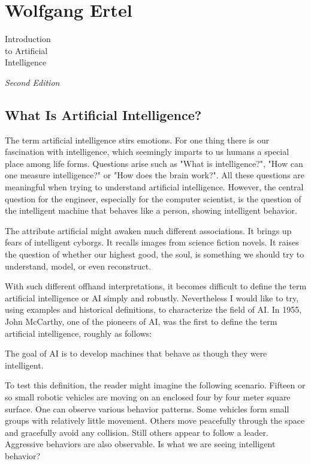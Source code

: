 \documentclass[10pt]{book}
\begin{document}
\section{Wolfgang Ertel}

\begin{center}
Introduction\\
to Artificial\\
Intelligence
\end{center}

\textit{Second Edition}

\tableofcontents

\tableofcontents

\subsection{What Is Artificial Intelligence?}
The term artificial intelligence stirs emotions. For one thing there is our fascination with intelligence, which seemingly imparts to us humans a special place among life forms. Questions arise such as "What is intelligence?", "How can one measure intelligence?" or "How does the brain work?". All these questions are meaningful when trying to understand artificial intelligence. However, the central question for the engineer, especially for the computer scientist, is the question of the intelligent machine that behaves like a person, showing intelligent behavior.

The attribute artificial might awaken much different associations. It brings up fears of intelligent cyborgs. It recalls images from science fiction novels. It raises the question of whether our highest good, the soul, is something we should try to understand, model, or even reconstruct.

With such different offhand interpretations, it becomes difficult to define the term artificial intelligence or AI simply and robustly. Nevertheless I would like to try, using examples and historical definitions, to characterize the field of AI. In 1955, John McCarthy, one of the pioneers of AI, was the first to define the term artificial intelligence, roughly as follows:

The goal of AI is to develop machines that behave as though they were intelligent.

To test this definition, the reader might imagine the following scenario. Fifteen or so small robotic vehicles are moving on an enclosed four by four meter square surface. One can observe various behavior patterns. Some vehicles form small groups with relatively little movement. Others move peacefully through the space and gracefully avoid any collision. Still others appear to follow a leader. Aggressive behaviors are also observable. Is what we are seeing intelligent behavior?
\end{document}
